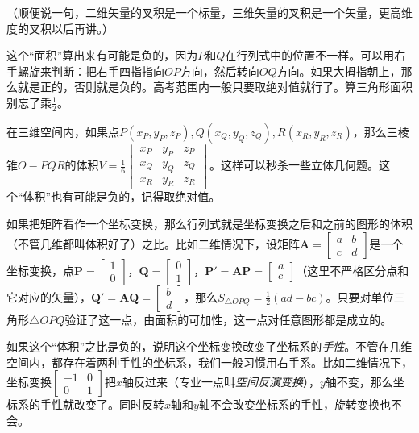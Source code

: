 （顺便说一句，二维矢量的叉积是一个标量，三维矢量的叉积是一个矢量，更高维度的叉积以后再讲。）

这个“面积”算出来有可能是负的，因为$P$和$Q$在行列式中的位置不一样。可以用右手螺旋来判断：把右手四指指向$O P$方向，然后转向$O Q$方向。如果大拇指朝上，那么就是正的，否则就是负的。高考范围内一般只要取绝对值就行了。算三角形面积别忘了乘$\frac{1}{2}$。

在三维空间内，如果点$P(x_P, y_P, z_P), Q(x_Q, y_Q, z_Q), R(x_R, y_R, z_R)$，那么三棱锥$O-P Q R$的体积$V=\frac{1}{6}\begin{vmatrix}
x_P & y_P & z_P \\
x_Q & y_Q & z_Q \\
x_R & y_R & z_R
\end{vmatrix}$。这样可以秒杀一些立体几何题。这个“体积”也有可能是负的，记得取绝对值。

如果把矩阵看作一个坐标变换，那么行列式就是坐标变换之后和之前的图形的体积（不管几维都叫体积好了）之比。比如二维情况下，设矩阵$\mathbf{A}=\begin{bmatrix}
a & b \\
c & d
\end{bmatrix}$是一个坐标变换，点$\mathbf{P}=\begin{bmatrix} 1 \\ 0 \end{bmatrix}$，$\mathbf{Q}=\begin{bmatrix} 0 \\ 1 \end{bmatrix}$，$\mathbf{P'}=\mathbf{A} \mathbf{P}=\begin{bmatrix} a \\ c \end{bmatrix}$（这里不严格区分点和它对应的矢量），$\mathbf{Q'}=\mathbf{A} \mathbf{Q}=\begin{bmatrix} b \\ d \end{bmatrix}$，那么$S_{\triangle O P Q}=\frac{1}{2}(a d-b c)$。只要对单位三角形$\triangle O P Q$验证了这一点，由面积的可加性，这一点对任意图形都是成立的。

如果这个“体积”之比是负的，说明这个坐标变换改变了坐标系的\emph{手性}。不管在几维空间内，都存在着两种手性的坐标系，我们一般习惯用右手系。比如二维情况下，坐标变换$\begin{bmatrix}
-1 & 0 \\
0 & 1
\end{bmatrix}$把$x$轴反过来（专业一点叫\emph{空间反演变换}），$y$轴不变，那么坐标系的手性就改变了。同时反转$x$轴和$y$轴不会改变坐标系的手性，旋转变换也不会。

